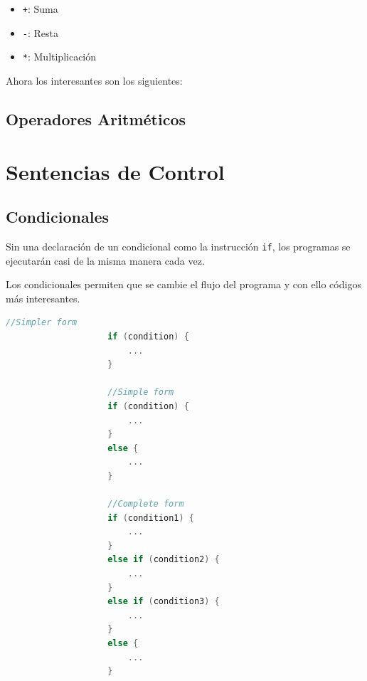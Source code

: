 \documentclass[12pt, fleqn]{report}                             %
\theoremstyle{break}                                            %
\begin{document}
                \begin{itemize}
                    \item \texttt{+}: Suma
                    \item \texttt{-}: Resta
                    \item \texttt{*}: Multiplicación
                \end{itemize}

                Ahora los interesantes son los siguientes:

            \subsection{Operadores Aritméticos}



        \clearpage
        \section{Sentencias de Control}

            \subsection{Condicionales}

                Sin una declaración de un condicional como la instrucción \texttt{if}, los programas
                se ejecutarán casi de la misma manera cada vez.
                
                Los condicionales permiten que se cambie el flujo del programa y con ello códigos
                más interesantes.

                \begin{lstlisting}[language=C++, gobble=10]
                    //Simpler form
                    if (condition) {
                        ...
                    }

                    //Simple form
                    if (condition) {
                        ...
                    }
                    else {
                        ...
                    }
                    
                    //Complete form
                    if (condition1) {
                        ...
                    }
                    else if (condition2) {
                        ...
                    }
                    else if (condition3) {
                        ...
                    }
                    else {
                        ...
                    }
                \end{lstlisting}
\end{document}
